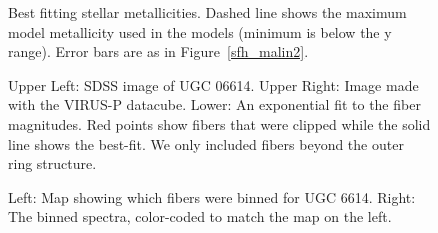 \documentclass{emulateapj}
\begin{document}
\begin{figure}
\caption{Best fitting stellar metallicities.   Dashed line shows the maximum model metallicity used in the models (minimum is below the y range).  Error bars are as in Figure~\ref{sfh_malin2}. \label{metal_malin2}}
\end{figure}


\begin{figure}
\caption{Upper Left:  SDSS image of UGC 06614.  Upper Right:  Image made with the VIRUS-P datacube.  Lower:  An exponential fit to the fiber magnitudes.  Red points show fibers that were clipped while the solid line shows the best-fit.  We only included fibers beyond the outer ring structure.  \label{ugc_fibers} }
\end{figure}




\begin{figure}
\caption{Left:  Map showing which fibers were binned for UGC 6614.  Right:  The binned spectra, color-coded to match the map on the left. \label{ugc_binmap}}
\end{figure}

\end{document}
